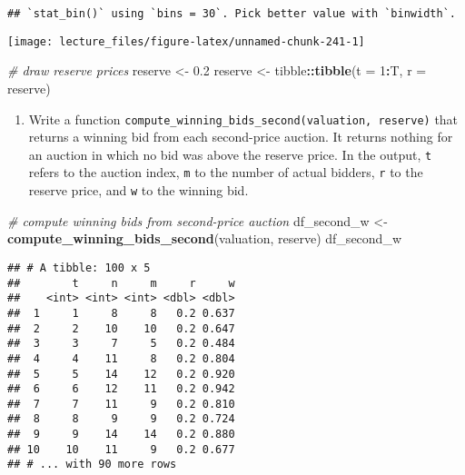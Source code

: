 \documentclass[
]{book}
\newenvironment{Shaded}{\begin{snugshade}}{\end{snugshade}}
\newcommand{\CommentTok}[1]{\textcolor[rgb]{0.56,0.35,0.01}{\textit{#1}}}
\newcommand{\DataTypeTok}[1]{\textcolor[rgb]{0.13,0.29,0.53}{#1}}
\newcommand{\DecValTok}[1]{\textcolor[rgb]{0.00,0.00,0.81}{#1}}
\newcommand{\FloatTok}[1]{\textcolor[rgb]{0.00,0.00,0.81}{#1}}
\newcommand{\KeywordTok}[1]{\textcolor[rgb]{0.13,0.29,0.53}{\textbf{#1}}}
\newcommand{\NormalTok}[1]{#1}
\newcommand{\OperatorTok}[1]{\textcolor[rgb]{0.81,0.36,0.00}{\textbf{#1}}}
\newcommand{\StringTok}[1]{\textcolor[rgb]{0.31,0.60,0.02}{#1}}
\providecommand{\tightlist}{%
  \setlength{\itemsep}{0pt}\setlength{\parskip}{0pt}}
\begin{document}
\begin{verbatim}
## `stat_bin()` using `bins = 30`. Pick better value with `binwidth`.
\end{verbatim}

\begin{center}\texttt{[image: lecture\_files/figure-latex/unnamed-chunk-241-1]} \end{center}

\begin{Shaded}
\begin{Highlighting}[]
\CommentTok{# draw reserve prices}
\NormalTok{reserve <-}\StringTok{ }\FloatTok{0.2}
\NormalTok{reserve <-}\StringTok{ }\NormalTok{tibble}\OperatorTok{::}\KeywordTok{tibble}\NormalTok{(}\DataTypeTok{t =} \DecValTok{1}\OperatorTok{:}\NormalTok{T, }\DataTypeTok{r =}\NormalTok{ reserve)}
\end{Highlighting}
\end{Shaded}

\begin{enumerate}
\def\labelenumi{\arabic{enumi}.}
\setcounter{enumi}{2}
\tightlist
\item
  Write a function \texttt{compute\_winning\_bids\_second(valuation,\ reserve)} that returns a winning bid from each second-price auction. It returns nothing for an auction in which no bid was above the reserve price. In the output, \texttt{t} refers to the auction index, \texttt{m} to the number of actual bidders, \texttt{r} to the reserve price, and \texttt{w} to the winning bid.
\end{enumerate}

\begin{Shaded}
\begin{Highlighting}[]
\CommentTok{# compute winning bids from second-price auction}
\NormalTok{df_second_w <-}
\StringTok{  }\KeywordTok{compute_winning_bids_second}\NormalTok{(valuation, reserve)}
\NormalTok{df_second_w}
\end{Highlighting}
\end{Shaded}

\begin{verbatim}
## # A tibble: 100 x 5
##        t     n     m     r     w
##    <int> <int> <int> <dbl> <dbl>
##  1     1     8     8   0.2 0.637
##  2     2    10    10   0.2 0.647
##  3     3     7     5   0.2 0.484
##  4     4    11     8   0.2 0.804
##  5     5    14    12   0.2 0.920
##  6     6    12    11   0.2 0.942
##  7     7    11     9   0.2 0.810
##  8     8     9     9   0.2 0.724
##  9     9    14    14   0.2 0.880
## 10    10    11     9   0.2 0.677
## # ... with 90 more rows
\end{verbatim}
\end{document}
